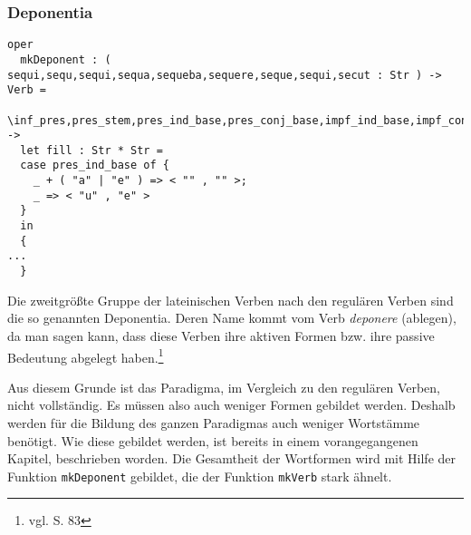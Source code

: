 \subsubsection{Deponentia}
\begin{lstlisting}[float=h!tp,caption={Kopf der Funktion um Deponentia-Formen zu bilden (vgl. \textbf{ResLat.gf})},label={GF-Res-MkDeponent},basicstyle=\small]
oper
  mkDeponent : ( sequi,sequ,sequi,sequa,sequeba,sequere,seque,sequi,secut : Str ) -> Verb =
    \inf_pres,pres_stem,pres_ind_base,pres_conj_base,impf_ind_base,impf_conj_base,fut_I_base,imp_base,part_stem -> 
  let fill : Str * Str =
  case pres_ind_base of {
    _ + ( "a" | "e" ) => < "" , "" >;
    _ => < "u" , "e" > 
  }
  in
  {
...
  }
\end{lstlisting}
Die zweitgrößte Gruppe der lateinischen Verben nach den regulären Verben sind die so genannten Deponentia. Deren Name kommt vom Verb \textit{deponere} (ablegen), da man sagen kann, dass diese Verben ihre aktiven Formen bzw. ihre passive Bedeutung abgelegt haben.\footnote{vgl. \cite{BAYER-LINDAUER1994} S. 83} \par
Aus diesem Grunde ist das Paradigma, im Vergleich zu den regulären Verben, nicht vollständig. Es müssen also auch weniger Formen gebildet werden. Deshalb werden für die Bildung des ganzen Paradigmas auch weniger Wortstämme benötigt. Wie diese gebildet werden, ist bereits in einem vorangegangenen Kapitel, beschrieben worden. Die Gesamtheit der Wortformen wird mit Hilfe der Funktion \texttt{mkDeponent} gebildet, die der Funktion \texttt{mkVerb} stark ähnelt.\par
